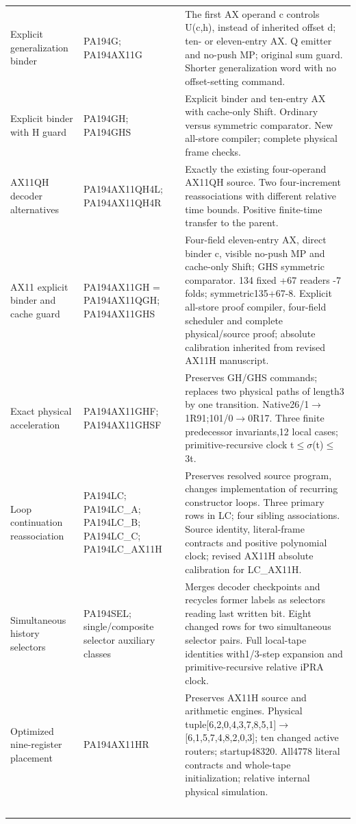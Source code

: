 \begin{longtable}{L{30mm}L{43mm}L{72mm}}
Explicit generalization binder & PA194G; PA194AX11G & The first AX operand c controls U(c,h), instead of inherited offset d; ten- or eleven-entry AX. Q emitter and no-push MP; original sum guard. Shorter generalization word with no offset-setting command.\\[4pt]
Explicit binder with H guard & PA194GH; PA194GHS & Explicit binder and ten-entry AX with cache-only Shift. Ordinary versus symmetric comparator. New all-store compiler; complete physical frame checks.\\[4pt]
AX11QH decoder alternatives & PA194AX11QH4L; PA194AX11QH4R & Exactly the existing four-operand AX11QH source. Two four-increment reassociations with different relative time bounds. Positive finite-time transfer to the parent.\\[4pt]
AX11 explicit binder and cache guard & PA194AX11GH = PA194AX11QGH; PA194AX11GHS & Four-field eleven-entry AX, direct binder c, visible no-push MP and cache-only Shift; GHS symmetric comparator. 134 fixed +67 readers -7 folds; symmetric135+67-8. Explicit all-store proof compiler, four-field scheduler and complete physical/source proof; absolute calibration inherited from revised AX11H manuscript.\\[4pt]
Exact physical acceleration & PA194AX11GHF; PA194AX11GHSF & Preserves GH/GHS commands; replaces two physical paths of length3 by one transition. Native26/1$\to$1R91;101/0$\to$0R17. Three finite predecessor invariants,12 local cases; primitive-recursive clock t$\le$$\sigma$(t)$\le$3t.\\[4pt]
Loop continuation reassociation & PA194LC; PA194LC\_A; PA194LC\_B; PA194LC\_C; PA194LC\_AX11H & Preserves resolved source program, changes implementation of recurring constructor loops. Three primary rows in LC; four sibling associations. Source identity, literal-frame contracts and positive polynomial clock; revised AX11H absolute calibration for LC\_AX11H.\\[4pt]
Simultaneous history selectors & PA194SEL; single/composite selector auxiliary classes & Merges decoder checkpoints and recycles former labels as selectors reading last written bit. Eight changed rows for two simultaneous selector pairs. Full local-tape identities with1/3-step expansion and primitive-recursive relative iPRA clock.\\[4pt]
Optimized nine-register placement & PA194AX11HR & Preserves AX11H source and arithmetic engines. Physical tuple[6,2,0,4,3,7,8,5,1]$\to$[6,1,5,7,4,8,2,0,3]; ten changed active routers; startup48320. All4778 literal contracts and whole-tape initialization; relative internal physical simulation.\\[4pt]
$$
\end{longtable}
